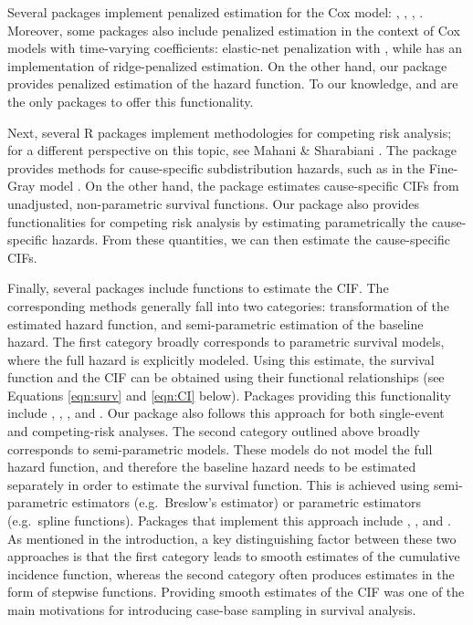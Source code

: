 Several packages implement penalized estimation for the Cox model:
 \citeyearpar{regpathcox}, 
\citeyearpar{park_hastie},  \citeyearpar{l1penal},
 \citeyearpar{gerds_blanche}. Moreover, some
packages also include penalized estimation in the context of Cox models
with time-varying coefficients: elastic-net penalization with
 \citeyearpar{clements_liu}, while 
\citeyearpar{survival-package} has an implementation of ridge-penalized
estimation. On the other hand, our package  provides
penalized estimation of the hazard function. To our knowledge,
 and  are the only packages to offer this
functionality.

Next, several R packages implement methodologies for competing risk
analysis; for a different perspective on this topic, see Mahani \&
Sharabiani \citeyearpar{mahani2015bayesian}. The package
 provides methods for cause-specific subdistribution
hazards, such as in the Fine-Gray model
\citeyearpar{fine1999proportional}. On the other hand, the package
 estimates cause-specific CIFs from unadjusted, non-parametric
survival functions. Our package  also provides
functionalities for competing risk analysis by estimating parametrically
the cause-specific hazards. From these quantities, we can then estimate
the cause-specific CIFs.

Finally, several packages include functions to estimate the CIF. The
corresponding methods generally fall into two categories: transformation
of the estimated hazard function, and semi-parametric estimation of the
baseline hazard. The first category broadly corresponds to parametric
survival models, where the full hazard is explicitly modeled. Using this
estimate, the survival function and the CIF can be obtained using their
functional relationships (see Equations \ref{eqn:surv} and \ref{eqn:CI}
below). Packages providing this functionality include ,
, , and . Our package
 also follows this approach for both single-event and
competing-risk analyses. The second category outlined above broadly
corresponds to semi-parametric models. These models do not model the
full hazard function, and therefore the baseline hazard needs to be
estimated separately in order to estimate the survival function. This is
achieved using semi-parametric estimators (e.g.~Breslow's estimator) or
parametric estimators (e.g.~spline functions). Packages that implement
this approach include , , and
. As mentioned in the introduction, a key distinguishing
factor between these two approaches is that the first category leads to
smooth estimates of the cumulative incidence function, whereas the
second category often produces estimates in the form of stepwise
functions. Providing smooth estimates of the CIF was one of the main
motivations for introducing case-base sampling in survival analysis.

